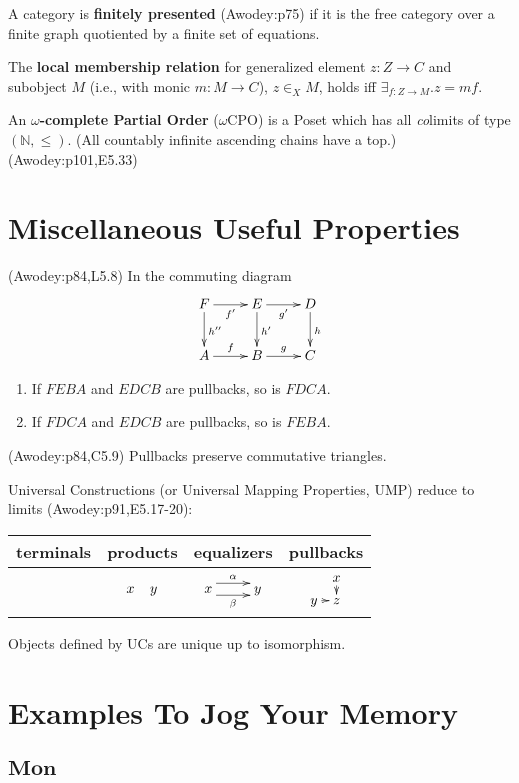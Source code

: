 \documentclass[10pt,twocolumn,letterpaper]{article}
\newcommand{\defn}[1]{{\bf #1}}
\begin{document}
  A category is \defn{finitely presented} (Awodey:p75) if it is the free
  category over a finite graph quotiented by a finite set of equations.

  The \defn{local membership relation} for generalized element $z : Z \to C$
  and subobject $M$ (i.e., with monic $m : M \to C$), $z \in_X M$, holds iff
  $\exists_{f:Z \to M} . z = mf$.

  An \defn{$\omega$-complete Partial Order} ($\omega$CPO) is a Poset which
    has all {\em co}limits of type $(\mathbb{N},\le)$.  (All countably
    infinite ascending chains have a top.) (Awodey:p101,E5.33)

\section{Miscellaneous Useful Properties}

  (Awodey:p84,L5.8) In the commuting diagram
    \[\xymatrix{ F \ar[r]_{f'} \ar[d]^{h''} & E \ar[r]_{g'} \ar[d]^{h'} & D \ar[d]^{h} \\
       A \ar[r]^f & B \ar[r]^g & C
    }\]
    \begin{enumerate}
      \item If $FEBA$ and $EDCB$ are pullbacks, so is $FDCA$.
      \item If $FDCA$ and $EDCB$ are pullbacks, so is $FEBA$.
    \end{enumerate}

  (Awodey:p84,C5.9) Pullbacks preserve commutative triangles.

  Universal Constructions (or Universal Mapping Properties, UMP) reduce to
  limits (Awodey:p91,E5.17-20):
  \begin{tabular}{|c|c|c|c|}
  	\hline
      terminals & products & equalizers & pullbacks \\
  	\hline
      & $\xymatrix@C5pt{x & y}$
      & $\xymatrix{x \ar@<1ex>[r]^{\alpha} \ar@<-1ex>[r]_{\beta} & y}$
      & $\xymatrix@C5pt@R5pt{& x \ar[d] \\ y \ar[r] & z}$\\
  	\hline
  \end{tabular}

  Objects defined by UCs are unique up to isomorphism.

\section{Examples To Jog Your Memory}

\subsection{$\mathbf{Mon}$}
\end{document}
